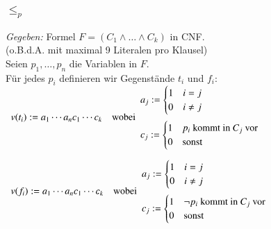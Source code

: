 \documentclass[onlymath]{beamer}
\begin{document}
\begin{frame}
  \frametitle{ $\leq_p$ }
    \emph{Gegeben: } Formel $F = (C_1 \wedge \dots \wedge C_k)$ in
  CNF.\\
  (o.B.d.A. mit maximal 9 Literalen pro Klausel)\pause\\[1ex]
  Seien $p_1, \dots, p_n$ die Variablen in $F$.\\
  Für jedes $p_i$ definieren wir Gegenstände $t_i$ und $f_i$:\\[10pt]

  $\begin{array}{ll}
    v(t_i) := a_1 \cdots a_n c_1 \cdots c_k & {\text{wobei}}
    \begin{array}{l}
      a_j :=
      \begin{cases}
        1 & i=j\\
        0 & i\not=j
      \end{cases}\\[15pt]
      c_j :=
      \begin{cases}
        1 & p_i \text{ kommt in } C_j\text{ vor}\\
        0 & \text{sonst}
      \end{cases}
    \end{array}
  \end{array}$

  \bigskip\pause

  $\begin{array}{ll}
    v(f_i) := a_1 \cdots a_n c_1 \cdots c_k & \text{wobei} 
    \begin{array}{l}
      a_j :=
      \begin{cases}
        1 & i=j\\
        0 & i\not=j
      \end{cases}\\[15pt]
      c_j :=
      \begin{cases}
        1 & {\neg p_i} \text{ kommt in } C_j\text{ vor}\\
        0 & \text{sonst}
      \end{cases}
    \end{array}
  \end{array}$
\end{frame}

\end{document}
